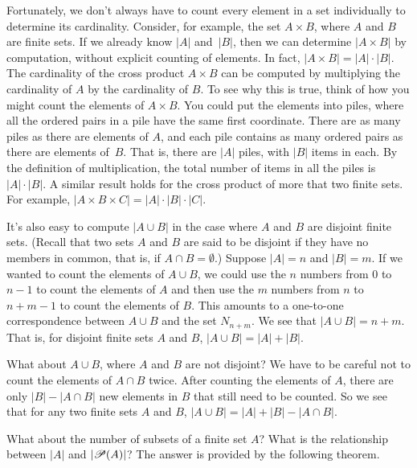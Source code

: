 Fortunately, we don't always have to count every element in a set individually
to determine its cardinality.  Consider, for example, the set $A\times B$,
where $A$ and $B$ are finite sets.  If we already know $|A|$ and~$|B|$,
then we can determine $|A\times B|$ by computation, without explicit counting of elements.
In fact, $|A\times B|=|A|\cdot |B|$.  The cardinality of the cross product
$A\times B$ can be computed by multiplying the cardinality of $A$ by
the cardinality of $B$.  To see why this is true, think of how you might
count the elements of $A\times B$.  You could put the elements into piles,
where all the ordered pairs in a pile have the same first coordinate.  There
are as many piles as there are elements of $A$, and each pile contains
as many ordered pairs as there are elements of~$B$.  That is, there
are $|A|$ piles, with $|B|$ items in each.  By the definition of multiplication,
the total number of items in all the piles is $|A|\cdot|B|$.
A similar result holds for the cross product of more that two finite sets.
For example, $|A\times B\times C|=|A|\cdot |B|\cdot |C|$.

It's also easy to compute $|A\cup B|$ in the case where $A$ and $B$ are
disjoint finite sets.  (Recall that two sets $A$ and $B$ are said to be
disjoint if they have no members in common, that is, if $A\cap B=\emptyset$.)
Suppose $|A|=n$ and $|B|=m$.  If we wanted to count the elements of $A\cup B$,
we could use the $n$ numbers from 0 to $n-1$ to count the elements of $A$
and then use the $m$ numbers from $n$ to $n+m-1$ to count the elements of
$B$.  This amounts to a one-to-one correspondence between $A\cup B$
and the set $N_{n+m}$.  We see that $|A\cup B|=n+m$.  That is,
for disjoint finite sets $A$ and $B$, $|A\cup B|=|A|+|B|$.

What about $A\cup B$, where $A$ and $B$ are not disjoint?  We have to be
careful not to count the elements of $A\cap B$ twice.  After counting
the elements of $A$, there are only $|B|-|A\cap B|$ new elements in $B$ that
still need to be counted.  So we see that for any two finite sets $A$ and $B$,
$|A\cup B|=|A|+|B|-|A\cap B|$.

What about the number of subsets of a finite set $A$?  What is the relationship
between $|A|$ and $|{\mathscr P}(A)|$?  The answer is provided by the following theorem.

